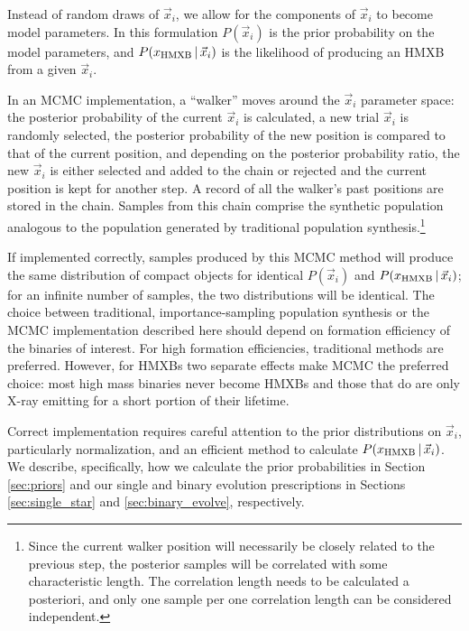 \documentclass[12pt, preprint]{aastex}
\newcommand{\given}{\,|\,}
\begin{document}
Instead of random draws of $\vec{x}_i$, we allow for the components of $\vec{x}_i$ to become model parameters. In this formulation $P(\vec{x}_i)$ is the prior probability on the model parameters, and $P(x_{\rm HMXB} \given \vec{x}_i)$ is the likelihood of producing an HMXB from a given $\vec{x}_i$. 


In an MCMC implementation, a ``walker'' moves around the $\vec{x}_i$ parameter space: the posterior probability of the current $\vec{x}_i$ is calculated, a new trial $\vec{x}_i$ is randomly selected, the posterior probability of the new position is compared to that of the current position, and depending on the posterior probability ratio, the new $\vec{x}_i$ is either selected and added to the chain or rejected and the current position is kept for another step. A record of all the walker's past positions are stored in the chain. Samples from this chain comprise the synthetic population analogous to the population generated by traditional population synthesis.\footnote{Since the current walker position will necessarily be closely related to the previous step, the posterior samples will be correlated with some characteristic length. The correlation length needs to be calculated a posteriori, and only one sample per one correlation length can be considered independent.}


If implemented correctly, samples produced by this MCMC method will produce the same distribution of compact objects for identical $P(\vec{x}_i)$ and $P(x_{\rm HMXB} \given \vec{x}_i)$; for an infinite number of samples, the two distributions will be identical. The choice between traditional, importance-sampling population synthesis or the MCMC implementation described here should depend on formation efficiency of the binaries of interest. For high formation efficiencies, traditional methods are preferred. However, for HMXBs two separate effects make MCMC the preferred choice: most high mass binaries never become HMXBs and those that do are only X-ray emitting for a short portion of their lifetime.


Correct implementation requires careful attention to the prior distributions on $\vec{x}_i$, particularly normalization, and an efficient method to calculate $P(x_{\rm HMXB} \given \vec{x}_i)$. We describe, specifically, how we calculate the prior probabilities in Section \ref{sec:priors} and our single and binary evolution prescriptions in Sections \ref{sec:single_star} and \ref{sec:binary_evolve}, respectively.
\end{document}
